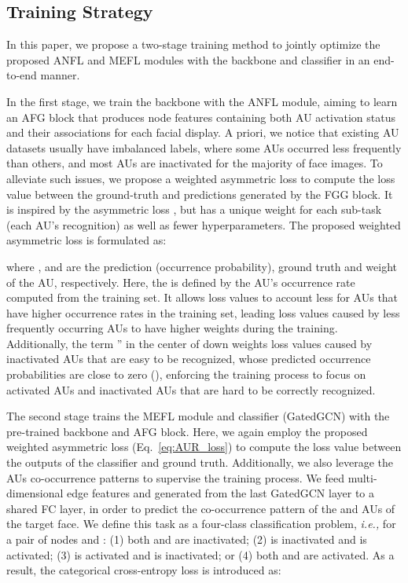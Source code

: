 \documentclass{article}
\begin{document}
\subsection{Training Strategy}


\noindent In this paper, we propose a two-stage training method to jointly optimize the proposed ANFL and MEFL modules with the backbone and classifier in an end-to-end manner. 



In the first stage, we train the backbone with the ANFL module, aiming to learn an AFG block that produces node features containing both AU activation status and their associations for each facial display. A priori, we notice that existing AU datasets usually have imbalanced labels, where some AUs occurred less frequently than others, and most AUs are inactivated for the majority of face images. To alleviate such issues, we propose a weighted asymmetric loss to compute the loss value between the ground-truth and predictions generated by the FGG block. It is inspired by the asymmetric loss \cite{ridnik2021asymmetric}, but has a unique weight for each sub-task (each AU's recognition) as well as fewer hyperparameters. The proposed weighted asymmetric loss is formulated as:


where ,  and  are the prediction (occurrence probability), ground truth and weight of the  AU, respectively. Here, the  is defined by the  AU's occurrence rate  computed from the training set. It allows loss values to account less for AUs that have higher occurrence rates in the training set, leading loss values caused by less frequently occurring AUs to have higher weights during the training. Additionally, the term '' in the center of  down weights loss values caused by inactivated AUs that are easy to be recognized, whose predicted occurrence probabilities are close to zero (), enforcing the training process to focus on activated AUs and inactivated AUs that are hard to be correctly recognized.


The second stage trains the MEFL module and classifier (GatedGCN) with the pre-trained backbone and AFG block. Here, we again employ the proposed weighted asymmetric loss (Eq.~\ref{eq:AUR_loss}) to compute the loss value  between the outputs of the classifier and ground truth. Additionally, we also leverage the AUs co-occurrence patterns to supervise the training process. We feed multi-dimensional edge features  and  generated from the last GatedGCN layer to a shared FC layer, in order to predict the co-occurrence pattern of the  and  AUs of the target face. We define this task as a four-class classification problem, \emph{i.e.,} for a pair of nodes  and : (1) both  and  are inactivated; (2)  is inactivated and  is activated; (3)  is activated and  is inactivated; or (4) both  and  are activated. As a result, the categorical cross-entropy loss is introduced as:
\end{document}
